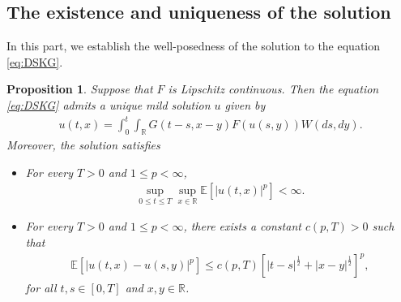 \documentclass[11pt,reqno]{amsart}
\numberwithin{equation}{section}
\newtheorem{proposition}[theorem]{Proposition}
\newcommand{\1}{{\bf 1}}
\newcommand{\2}{{\bf 2}}
\begin{document}
     
  
\subsection{The existence and uniqueness of the solution} 
 In this part, we establish the well-posedness of the solution to the equation \eqref{eq:DSKG}.

 
\begin{proposition}\label{prop solution Holder}  
Suppose that $F$ is Lipschitz continuous.  Then the equation \eqref{eq:DSKG} admits a   unique mild solution $u$   given by 
\begin{equation}\label{eq:mild sol}
    \begin{split}
    u(t, x)=    \int_0^t \int_{\mathbb R} G(t-s, x-y) F(u(s, y)) W(ds, dy).
     \end{split}
\end{equation}
  Moreover,  the solution satisfies  
\begin{itemize}
 \item[(a)] For every  $T>0$ and  $1 \le p<\infty$,  
\begin{align}\label{eq moment bound}
\sup_{0\le t\le T}\sup_{x\in \mathbb R}\mathbb E\left[|u(t,x)|^p\right]<\infty. 
\end{align}
 
\item[(b)] For every  $T>0$  and $1 \le p<\infty$,  there exists a constant $c(p, T)>0$ such that 
\begin{align}\label{eq Holder}
\mathbb E\left[\left|u(t, x)-u(s, y)\right|^p \right]\le c(p, T)\left[|t-s|^{\frac{1}{2}}+|x-y|^{\frac{1}{2}} \right]^{p},
\end{align}
for all $t, s\in [0,T]$ and $x, y\in \mathbb R$. 
\end{itemize}
  \end{proposition}
\end{document}
